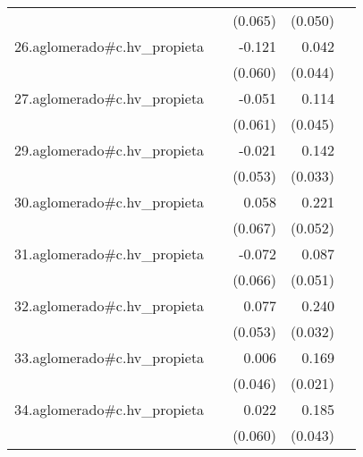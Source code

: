 {\begin{longtable}{l*{4}{D{.}{.}{-1}}}
            &                     &     (0.065)         &     (0.050)         &                     \\
\addlinespace
26.aglomerado#c.hv\_propieta&                     &      -0.121\sym{*}  &       0.042         &                     \\
            &                     &     (0.060)         &     (0.044)         &                     \\
\addlinespace
27.aglomerado#c.hv\_propieta&                     &      -0.051         &       0.114\sym{*}  &                     \\
            &                     &     (0.061)         &     (0.045)         &                     \\
\addlinespace
29.aglomerado#c.hv\_propieta&                     &      -0.021         &       0.142\sym{***}&                     \\
            &                     &     (0.053)         &     (0.033)         &                     \\
\addlinespace
30.aglomerado#c.hv\_propieta&                     &       0.058         &       0.221\sym{***}&                     \\
            &                     &     (0.067)         &     (0.052)         &                     \\
\addlinespace
31.aglomerado#c.hv\_propieta&                     &      -0.072         &       0.087         &                     \\
            &                     &     (0.066)         &     (0.051)         &                     \\
\addlinespace
32.aglomerado#c.hv\_propieta&                     &       0.077         &       0.240\sym{***}&                     \\
            &                     &     (0.053)         &     (0.032)         &                     \\
\addlinespace
33.aglomerado#c.hv\_propieta&                     &       0.006         &       0.169\sym{***}&                     \\
            &                     &     (0.046)         &     (0.021)         &                     \\
\addlinespace
34.aglomerado#c.hv\_propieta&                     &       0.022         &       0.185\sym{***}&                     \\
            &                     &     (0.060)         &     (0.043)         &                     \\

\end{longtable}}
